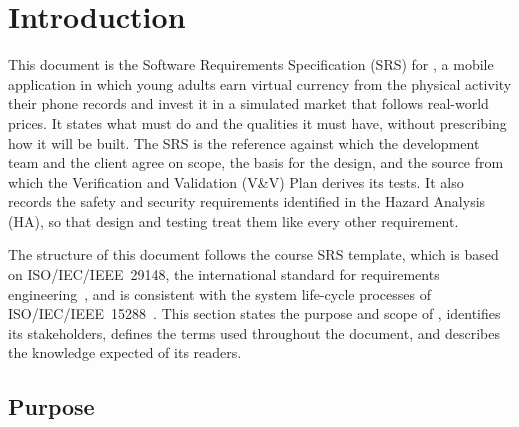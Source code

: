 \documentclass[12pt]{article}
\begin{document}
\section{Introduction} 




This document is the Software Requirements Specification (SRS) for
\progname{}, a mobile application in which young adults earn virtual currency
from the physical activity their phone records and invest it in a simulated
market that follows real-world prices. It states what \progname{} must do and
the qualities it must have, without prescribing how it will be built. The SRS
is the reference against which the development team and the client agree on
scope, the basis for the design, and the source from which the Verification
and Validation (V\&V) Plan derives its tests. It also records the safety and
security requirements identified in the Hazard Analysis (HA), so that design
and testing treat them like every other requirement.

The structure of this document follows the course SRS template, which is based
on ISO/IEC/IEEE~29148, the international standard for requirements
engineering~\citep{ISOIECIEEE29148_2018}, and is consistent with the system
life-cycle processes of ISO/IEC/IEEE~15288~\citep{ISOIECIEEE15288_2023}. This
section states the purpose and scope of \progname{}, identifies its
stakeholders, defines the terms used throughout the document, and describes
the knowledge expected of its readers.

\subsection{Purpose}

\end{document}
